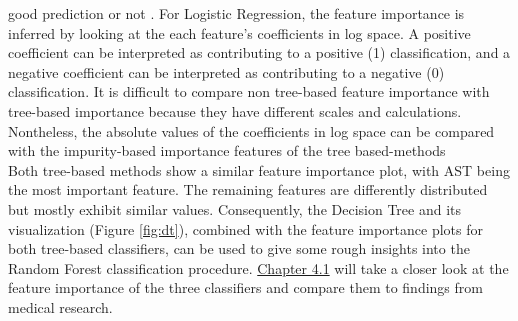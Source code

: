 good prediction or not \cite{RN178}.
For Logistic Regression, the feature importance is inferred by looking at the 
each feature's coefficients in log space. A positive coefficient can be 
interpreted as contributing to a positive (1) classification, and a negative 
coefficient can be interpreted as contributing to a negative (0) classification.
It is difficult to compare non tree-based feature importance with tree-based 
importance because they have different scales and calculations. Nontheless, the 
absolute values of the coefficients in log space can be compared with the 
impurity-based importance features of the tree based-methods
\\
Both tree-based methods show a similar feature importance plot, with AST being 
the most important feature. The remaining features are differently distributed 
but mostly exhibit similar values. Consequently, the Decision Tree and its 
visualization (Figure \ref{fig:dt}), combined with the feature 
importance plots for both tree-based classifiers, can be used to give some 
rough insights into the Random Forest classification procedure. 
\hyperref[sec:medical]{Chapter 4.1} will take a closer look at the feature 
importance of the three classifiers and compare them to findings from medical 
research.

